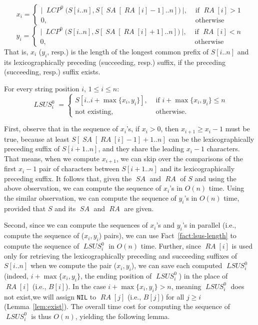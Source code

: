 \documentclass[11pt]{llncs}
\DeclareMathOperator{\lsus}{\mathit{LSUS}}
\DeclareMathOperator{\sa}{\mathit{SA}}
\DeclareMathOperator{\rank}{\mathit{RA}}
\DeclareMathOperator{\lcp}{\mathit{LCP}}
\begin{document}
\begin{definition}
\label{def:hl}
$$
x_i = 
\left \{
\begin{array}{ll} 
\bigl|\
\lcp^0\bigl(S[i..n],S\left[\sa\left[\rank[i]-1\right].. n\right]\bigr)\
\bigr|, & \textrm{\ \ \ if\ }\rank[i] > 1  \\
0, & \textrm{\ \ \ otherwise}
\end{array}
\right.
$$
$$
y_i = 
\left \{
\begin{array}{ll} 
\bigl|\
\lcp^0\bigl(S[i..n],S\left[\sa\left[\rank[i]+1\right].. n\right]\bigr)\
\bigr|, & \textrm{\ \ \ if\ }\rank[i] < n  \\
0, & \textrm{\ \ \ otherwise}
\end{array}
\right.
$$
That is, $x_i$ ($y_i$, resp.) is the length of the longest
common prefix of $S[i..n]$
and its lexicographically preceding (succeeding, resp.)
suffix, if the preceding (succeeding, resp.) suffix exists. 
\end{definition}


\begin{fact}
\label{fact:lsus-length}
For every string position $i$,  $1\leq i \leq n$: 
$$
\lsus_i^0 = \left\{
  \begin{array}{ll}
    S\left[i.. i+\max\{x_i,y_i\}\right], & \textrm{\ \ if } i+\max\{x_i, y_i\} \leq n \\
    \textrm{not existing}, & \textrm{\ \ otherwise.}
  \end{array}
\right.
$$
\end{fact}

First, observe that in the sequence of $x_i$'s, if $x_i > 0$, then $x_{i+1}
\geq x_i-1$ must be true, because at least $S[\sa[\rank[i]-1]+1 ..
n]$ can be the lexicographically preceding suffix of $S[i+1.. n]$,
and they share the leading $x_i-1$ characters.  That means, when we compute
$x_{i+1}$, we can skip over the comparisons of the first $x_i-1$ pair
of characters between $S[i+1.. n]$ and its lexicographically
preceding suffix. It follows that, given the $\sa$ and $\rank$ of $S$ and using the
above observation, we can compute the sequence of $x_i$'s in $O(n)$
time. 
Using the similar observation, we can compute the sequence of $y_i$'s in
$O(n)$ time, provided that $S$ and its $\sa$ and $\rank$ are given.

Second, since we can compute the sequences of $x_i$'s and $y_i$'s in
parallel (i.e., compute the sequence of ($x_i,y_i$) pairs), we can use
Fact~\ref{fact:lsus-length} to compute the sequence of $\lsus_i^0$ in
$O(n)$ time.  Further, since $\rank[i]$ is used only for retrieving
the lexicographically preceding and succeeding suffixes of $S[i..n]$
when we compute the pair ($x_i, y_i$), we can save each computed
$\lsus_i^0$ (indeed, $i+\max\{x_i,y_i\}$, the ending position of
$\lsus_i^0$) in the place of $\rank[i]$ (i.e., $B[i]$).  In the case
$i + \max\{x_i,y_i\} > n$, meaning $\lsus_i^0$ does not exist,we will
assign {\tt NIL} to $\rank[j]$ (i.e., $B[j]$) for all $j\geq i$
(Lemma~\ref{lem:exist}). The overall time cost for computing the
sequence of $\lsus_i^0$ is thus $O(n)$, yielding the following lemma.
\end{document}
